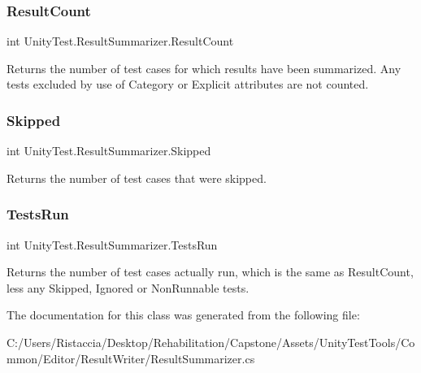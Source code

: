 \subsubsection{\texorpdfstring{Result\+Count}{ResultCount}}
{\footnotesize\ttfamily int Unity\+Test.\+Result\+Summarizer.\+Result\+Count\hspace{0.3cm}{\ttfamily [get]}}



Returns the number of test cases for which results have been summarized. Any tests excluded by use of Category or Explicit attributes are not counted. 

\mbox{\label{class_unity_test_1_1_result_summarizer_a80b800e5fcdea3ed9fb2959a4183bc04}} 
\subsubsection{\texorpdfstring{Skipped}{Skipped}}
{\footnotesize\ttfamily int Unity\+Test.\+Result\+Summarizer.\+Skipped\hspace{0.3cm}{\ttfamily [get]}}



Returns the number of test cases that were skipped. 

\mbox{\label{class_unity_test_1_1_result_summarizer_a3bd8726e51300403ced1456d12ddad19}} 
\subsubsection{\texorpdfstring{Tests\+Run}{TestsRun}}
{\footnotesize\ttfamily int Unity\+Test.\+Result\+Summarizer.\+Tests\+Run\hspace{0.3cm}{\ttfamily [get]}}



Returns the number of test cases actually run, which is the same as Result\+Count, less any Skipped, Ignored or Non\+Runnable tests. 



The documentation for this class was generated from the following file\+:\begin{DoxyCompactItemize}
\item 
C\+:/\+Users/\+Ristaccia/\+Desktop/\+Rehabilitation/\+Capstone/\+Assets/\+Unity\+Test\+Tools/\+Common/\+Editor/\+Result\+Writer/Result\+Summarizer.\+cs\end{DoxyCompactItemize}
